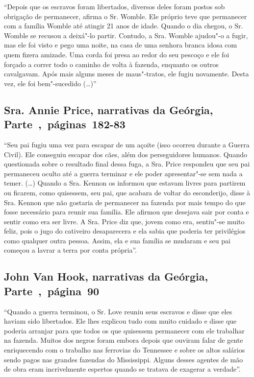 ``Depois que os escravos foram libertados, diversos deles foram postos
sob obrigação de permanecer, afirma o Sr. Womble. Ele próprio teve que
permanecer com a família Womble até atingir 21 anos de idade. Quando o
dia chegou, o Sr. Womble se recusou a deixá"-lo partir. Contudo, a Sra.
Womble ajudou"-o a fugir, mas ele foi visto e pego uma noite, na casa de
uma senhora branca idosa com quem fizera amizade. Uma corda foi presa ao
redor do seu pescoço e ele foi forçado a correr todo o caminho de volta
à fazenda, enquanto os outros cavalgavam. Após mais alguns meses de
maus"-tratos, ele fugiu novamente. Desta vez, ele foi bem"-sucedido
(\ldots{})''

\subsection{Sra. Annie Price, narrativas da Geórgia, Parte~,~páginas~182-83}
\label{ref214}

``Seu pai fugiu uma vez para escapar de um açoite (isso ocorreu durante
a Guerra Civil). Ele conseguiu escapar dos cães, além dos perseguidores
humanos. Quando questionada sobre o resultado final dessa fuga, a Sra.
Price respondeu que seu pai permaneceu oculto até a guerra terminar e
ele poder apresentar"-se sem nada a temer. (\ldots{}) Quando a Sra.
Kennon os informou que estavam livres para partirem ou ficarem, como
quisessem, seu pai, que acabara de voltar do esconderijo, disse à Sra.
Kennon que não gostaria de permanecer na fazenda por mais tempo do que
fosse necessário para reunir sua família. Ele afirmou que desejava sair
por conta e sentir como era ser livre. A Sra. Price diz que, jovem como
era, sentiu"-se muito feliz, pois o jugo do cativeiro desaparecera e ela
sabia que poderia ter privilégios como qualquer outra pessoa. Assim, ela
e sua família se mudaram e seu pai começou a lavrar a terra por conta
própria''.

\subsection{John Van Hook, narrativas da Geórgia, Parte~,~página~90}
\label{ref265}

``Quando a guerra terminou, o Sr. Love reuniu seus escravos e disse que
eles haviam sido libertados. Ele lhes explicou tudo com muito cuidado e
disse que poderia arranjar para que todos os que quisessem permanecer
com ele trabalhar na fazenda. Muitos dos negros foram embora depois que
ouviram falar de gente enriquecendo com o trabalho nas ferrovias do
Tennessee e sobre os altos salários sendo pagos nas grandes fazendas do
Mississippi. Alguns desses agentes de mão de obra eram incrivelmente
espertos quando se tratava de exagerar a verdade''.

